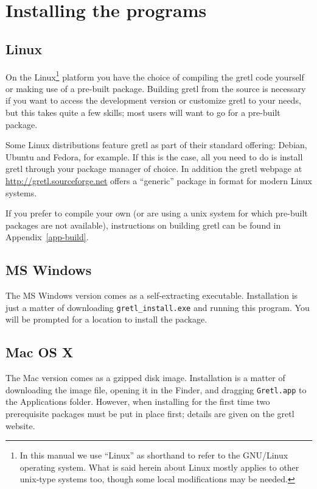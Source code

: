 \section{Installing the programs}
\label{install}

\subsection{Linux}
\label{linux-install}

On the Linux\footnote{In this manual we use ``Linux'' as shorthand to
  refer to the GNU/Linux operating system.  What is said herein about
  Linux mostly applies to other unix-type systems too, though some
  local modifications may be needed.} platform you have the choice of
compiling the gretl code yourself or making use of a pre-built
package. Building gretl from the source is necessary if you want
to access the development version or customize gretl to your
needs, but this takes quite a few skills; most users will want to go
for a pre-built package.

Some Linux distributions feature gretl as part of their standard
offering: Debian, Ubuntu and Fedora, for example.  If this is the
case, all you need to do is install gretl through your package
manager of choice. In addition the gretl webpage at
\url{http://gretl.sourceforge.net} offers a ``generic'' package in
 format for modern Linux systems.

If you prefer to compile your own (or are using a unix system for
which pre-built packages are not available), instructions on building
gretl can be found in Appendix~\ref{app-build}.

\subsection{MS Windows}
\label{windows-install}

The MS Windows version comes as a self-extracting executable.
Installation is just a matter of downloading \verb+gretl_install.exe+
and running this program. You will be prompted for a location to
install the package.

\subsection{Mac OS X}
\label{mac-install}

The Mac version comes as a gzipped disk image. Installation is a
matter of downloading the image file, opening it in the Finder, and
dragging \texttt{Gretl.app} to the Applications folder. However, when
installing for the first time two prerequisite packages must be
put in place first; details are given on the gretl website.

